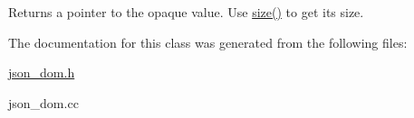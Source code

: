 \begin{DoxyReturn}{Returns}
a pointer to the opaque value. Use \mbox{\hyperlink{classJson__opaque_a2fbbcd3d9081289cc0c591630e219ae1}{size()}} to get its size. 
\end{DoxyReturn}


The documentation for this class was generated from the following files\+:\begin{DoxyCompactItemize}
\item 
\mbox{\hyperlink{json__dom_8h}{json\+\_\+dom.\+h}}\item 
json\+\_\+dom.\+cc\end{DoxyCompactItemize}
